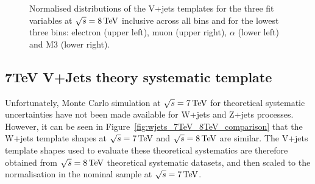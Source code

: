 \begin{figure}[hbtp]
	 \caption{Normalised distributions of the V+jets templates for the three fit variables at $\sqrt{s}=8\,\text{Te\hspace{-.08em}V}$
	 inclusive across all \met bins and for the lowest three \met bins: electron \abseta (upper
	 left), muon \abseta (upper right), $\alpha$ (lower left) and M3 (lower right).}
     \label{fig:MET_fit_variable_vjets_comparisons_8TeV}
\end{figure}
\FloatBarrier

\subsection{7TeV V+Jets theory systematic template}
\label{ss:7TeV_vjets_theory_systematic_template}
Unfortunately, Monte Carlo simulation at $\sqrt{s}=7\,\text{Te\hspace{-.08em}V}$ for theoretical systematic uncertainties have not
been made available for W+jets and Z+jets processes. However, it can be seen in
Figure~\ref{fig:wjets_7TeV_8TeV_comparison} that the W+jets template shapes at $\sqrt{s}=7\,\text{Te\hspace{-.08em}V}$ and
$\sqrt{s}=8\,\text{Te\hspace{-.08em}V}$ are similar. The V+jets template shapes used to evaluate these theoretical systematics are
therefore obtained from $\sqrt{s}=8\,\text{Te\hspace{-.08em}V}$ theoretical systematic datasets, and then scaled to the normalisation
in the nominal sample at $\sqrt{s}=7\,\text{Te\hspace{-.08em}V}$.

